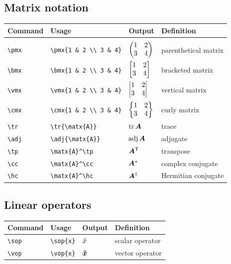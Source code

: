 \documentclass[11pt]{article}
\begin{document}
\subsection{Matrix notation}

\begin{tabular}{llll}
    Command     & Usage                            & Output                      & Definition           \\
    \hline                                                                                              \\ [-3ex]
    \verb|\pmx| & \verb|\pmx{1 & 2 \\ 3 & 4}|      & $\begin{pmatrix} 1 & 2 \\ 3 & 4 \end{pmatrix}$      & parenthetical matrix \\ [3ex]
    \verb|\bmx| & \verb|\bmx{1 & 2 \\ 3 & 4}|      & $\begin{bmatrix} 1 & 2 \\ 3 & 4 \end{bmatrix}$      & bracketed matrix     \\ [3ex]
    \verb|\vmx| & \verb|\vmx{1 & 2 \\ 3 & 4}|      & $\begin{vmatrix} 1 & 2 \\ 3 & 4 \end{vmatrix}$      & vertical matrix      \\ [3ex]
    \verb|\cmx| & \verb|\cmx{1 & 2 \\ 3 & 4}|      & $\begin{Bmatrix} 1 & 2 \\ 3 & 4 \end{Bmatrix}$      & curly matrix         \\ [3ex]
    \verb|\tr|  & \verb|\tr{\matx{A}}|             & $\operatorname{tr}{\bm{A}}$             & trace                \\
    \verb|\adj| & \verb|\adj{\matx{A}}|            & $\operatorname{adj}{\bm{A}}$            & adjugate             \\
    \verb|\tp|  & \verb|\matx{A}^\tp|              & $\bm{A}^{\mathsf{T}}$              & transpose            \\
    \verb|\cc|  & \verb|\matx{A}^\cc|              & $\bm{A}^*$              & complex conjugate    \\
    \verb|\hc|  & \verb|\matx{A}^\hc|              & $\bm{A}^\dag$              & Hermitian conjugate  \\
\end{tabular}

\subsection{Linear operators}

\begin{tabular}{llll}
    Command     & Usage          & Output    & Definition      \\
    \hline
    \verb|\sop| & \verb|\sop{x}| & $\hat{x}$ & scalar operator \\
    \verb|\vop| & \verb|\vop{x}| & $\bm{\hat{x}}$ & vector operator \\
\end{tabular}
\end{document}
